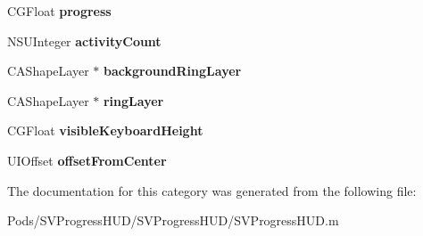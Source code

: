 \begin{DoxyCompactItemize}
C\+G\+Float {\bfseries progress}
\item 
\mbox{\label{category_s_v_progress_h_u_d_07_08_a012bd5fd51e09a04f4d17a20ce7e2918}} 
N\+S\+U\+Integer {\bfseries activity\+Count}
\item 
\mbox{\label{category_s_v_progress_h_u_d_07_08_a36526e42f25f6ccae69247f48d7472a1}} 
C\+A\+Shape\+Layer $\ast$ {\bfseries background\+Ring\+Layer}
\item 
\mbox{\label{category_s_v_progress_h_u_d_07_08_a14dc5ae37348d2be332e99bdb18fe6cc}} 
C\+A\+Shape\+Layer $\ast$ {\bfseries ring\+Layer}
\item 
\mbox{\label{category_s_v_progress_h_u_d_07_08_a74edd9e1b33b498abccced983bbb613f}} 
C\+G\+Float {\bfseries visible\+Keyboard\+Height}
\item 
\mbox{\label{category_s_v_progress_h_u_d_07_08_adfc87e1391760e2430fe51618ba0a3db}} 
U\+I\+Offset {\bfseries offset\+From\+Center}
\end{DoxyCompactItemize}


The documentation for this category was generated from the following file\+:\begin{DoxyCompactItemize}
\item 
Pods/\+S\+V\+Progress\+H\+U\+D/\+S\+V\+Progress\+H\+U\+D/S\+V\+Progress\+H\+U\+D.\+m\end{DoxyCompactItemize}
